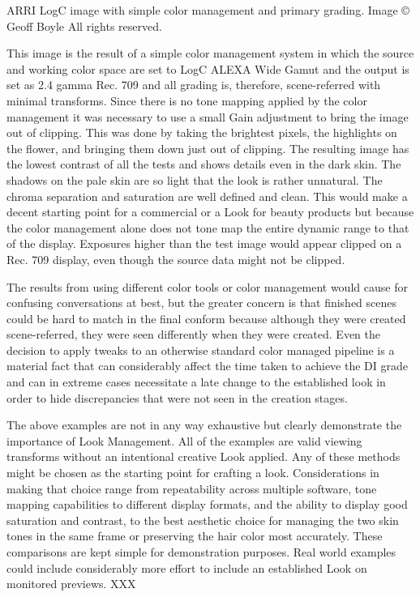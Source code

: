 ARRI LogC image with simple color management and primary grading.  Image © Geoff Boyle All rights reserved.

This image is the result of a simple color management system in which the source and working color space are set to LogC ALEXA Wide Gamut and the output is set as 2.4 gamma Rec. 709 and all grading is, therefore, scene-referred with minimal transforms. Since there is no tone mapping applied by the color management it was necessary to use a small Gain adjustment to bring the image out of clipping. This was done by taking the brightest pixels, the highlights on the flower, and bringing them down just out of clipping. The resulting image has the lowest contrast of all the tests and shows details even in the dark skin. The shadows on the pale skin are so light that the look is rather unnatural. The chroma separation and saturation are well defined and clean. This would make a decent starting point for a commercial or a Look for beauty products but because the color management alone does not tone map the entire dynamic range to that of the display. Exposures higher than the test image would appear clipped on a Rec. 709 display, even though the source data might not be clipped.

The results from using different color tools or color management would cause for confusing conversations at best, but the greater concern is that finished scenes could be hard to match in the final conform because although they were created scene-referred, they were seen differently when they were created. Even the decision to apply tweaks to an otherwise standard color managed pipeline is a material fact that can considerably affect the time taken to achieve the DI grade and can in extreme cases necessitate a late change to the established look in order to hide discrepancies that were not seen in the creation stages.

The above examples are not in any way exhaustive but clearly demonstrate the importance of Look Management. All of the examples are valid viewing transforms without an intentional creative Look applied. Any of these methods might be chosen as the starting point for crafting a look. Considerations in making that choice range from repeatability across multiple software, tone mapping capabilities to different display formats, and the ability to display good saturation and contrast, to the best aesthetic choice for managing the two skin tones in the same frame or preserving the hair color most accurately. These comparisons are kept simple for demonstration purposes. Real world examples could include considerably more effort to include an established Look on monitored previews.
XXX

